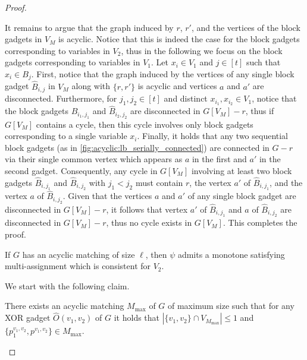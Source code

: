 \begin{proof}
\begin{nestedproof}
            It remains to argue that the graph induced by $r$, $r'$, and the vertices of the block gadgets in $V_M$ is acyclic.
            Notice that this is indeed the case for the block gadgets corresponding to variables in $V_2$,
            thus in the following we focus on the block gadgets corresponding to variables in $V_1$.
            Let $x_i \in V_1$ and $j \in [t]$ such that $x_i \in B_j$.
            First, notice that the graph induced by the vertices of any single block gadget $\hat{B}_{i,j}$ in $V_M$ along with $\{r,r'\}$
            is acyclic and vertices $a$ and $a'$ are disconnected.
            Furthermore, for $j_1, j_2 \in [t]$ and distinct $x_{i_1},x_{i_2} \in V_1$,
            notice that the block gadgets $\hat{B}_{i_1,j_1}$ and $\hat{B}_{i_2,j_2}$
            are disconnected in $G[V_M] - r$, thus if $G[V_M]$ contains a cycle,
            then this cycle involves only block gadgets corresponding to a single variable $x_i$.
            Finally, it holds that any two sequential block gadgets (as in \cref{fig:acyclic:lb_serially_connected})
            are connected in $G - r$ via their single common vertex which appears as $a$ in the first and $a'$ in the second gadget.
            Consequently, any cycle in $G[V_M]$ involving at least two block gadgets $\hat{B}_{i,j_1}$ and $\hat{B}_{i,j_2}$ with $j_1 < j_2$
            must contain $r$, the vertex $a'$ of $\hat{B}_{i,j_1}$, and the vertex $a$ of $\hat{B}_{i,j_2}$.
            Given that the vertices $a$ and $a'$ of any single block gadget are disconnected in $G[V_M] - r$,
            it follows that vertex $a'$ of $\hat{B}_{i,j_1}$ and $a$ of $\hat{B}_{i,j_2}$
            are disconnected in $G[V_M] - r$, thus no cycle exists in $G[V_M]$.
            This completes the proof.
        \end{nestedproof}

        \begin{lemma}
            If $G$ has an acyclic matching of size $\ell$,
            then $\psi$ admits a monotone satisfying multi-assignment which is consistent for $V_2$.
        \end{lemma}

        \begin{nestedproof}
            We start with the following claim.

            \begin{claim}\label{claim:acyclic:lb:acyclic->csp:maximum_matching}
                There exists an acyclic matching $M_{\max}$ of $G$ of maximum size such that
                for any XOR gadget $\hat{O}(v_1,v_2)$ of $G$ it holds that $|\{v_1,v_2\} \cap V_{M_{\max}}| \le 1$
                and $\{p^{v_1,v_2}_1,p^{v_1,v_2}\} \in M_{\max}$.
            \end{claim}


\end{nestedproof}
\end{proof}
